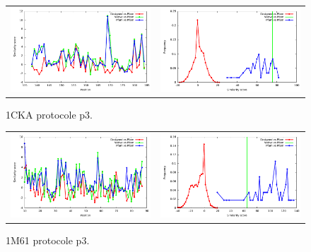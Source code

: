 \documentclass[a4paper,12pt]{article}
\begin{document}
   \begin{figure}[t]
     \centering
     \begin{tabular}{cc}
       \includegraphics[width=8.45cm]{gen_08032012/1CKA/p3/similarity_bypos.pdf} &
       \includegraphics[width=8.45cm]{gen_08032012/1CKA/p3/similarity_byseq_frequency.pdf} \\
     \end{tabular}
     
     \caption{1CKA protocole p3.}
     \label{1CKA}
   \end{figure}
   \begin{figure}[t]
     \centering
     \begin{tabular}{cc}
       \includegraphics[width=8.45cm]{gen_08032012/1M61/p3/similarity_bypos.pdf} &
       \includegraphics[width=8.45cm]{gen_08032012/1M61/p3/similarity_byseq_frequency.pdf} \\
     \end{tabular}
     
     \caption{1M61 protocole p3.}
     \label{1M61}
   \end{figure}
\end{document}
